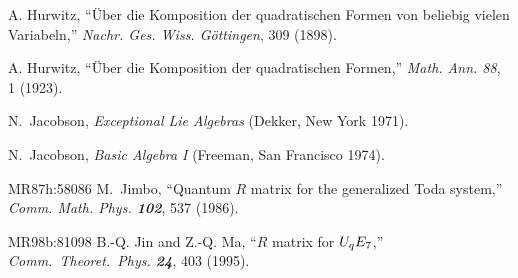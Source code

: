 

 A. Hurwitz,
     ``\"Uber die Komposition der quadratischen Formen von
    beliebig vielen Variabeln,''
    {\em Nachr. Ges. Wiss. G\"ottingen}, 309 (1898). %

 A. Hurwitz,
    ``\"Uber die Komposition der quadratischen Formen,''
    {\em Math. Ann. 88}, 1 (1923). %





 N.~Jacobson,
    {\em Exceptional Lie Algebras}
    (Dekker, New York 1971).

 N.~Jacobson,
        {\em Basic Algebra I}
    (Freeman, San Francisco 1974).


        {MR87h:58086}
M.~Jimbo,
``Quantum {$R$} matrix for the generalized Toda system,''
{\em Comm. Math. Phys.  \bf 102}, 537 (1986).  %

        {MR98b:81098} B.-Q. Jin and Z.-Q. Ma,
    ``$R$ matrix for $U\sb qE\sb 7$,''
    {\em Comm.~Theoret.~Phys.  \bf 24}, 403 (1995). %

%

